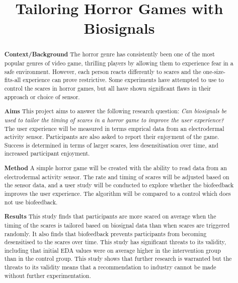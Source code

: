 \documentclass[12pt,a4paper]{article}\usepackage[]{graphicx}\usepackage[]{color}
\title{Tailoring Horror Games with Biosignals}
\author{} %
\date{}
\begin{document}
\maketitle
\begin{abstract}


\textbf{Context/Background}
The horror genre has consistently been one of the most popular genres of video game, thrilling players by allowing them to experience fear in a safe environment.
However, each person reacts differently to scares and the one-size-fits-all experience can prove restrictive.
Some experiments have attempted to use  to control the scares in horror games, but all have shown significant flaws in their approach or choice of sensor.

\textbf{Aims}
This project aims to answer the following research question: \emph{Can biosignals be used to tailor the timing of scares in a horror game to improve the user experience?}
The user experience will be measured in terms emprical data from an electrodermal activity sensor.
Participants are also asked to report their enjoyment of the game.
Success is determined in terms of larger scares, less desensitisation over time, and increased participant enjoyment.

\textbf{Method}
A simple horror game will be created with the ability to read data from an electrodermal activity sensor.
The rate and timing of scares will be adjusted based on the sensor data, and a user study will be conducted to explore whether the biofeedback improves the user experience.
The algorithm will be compared to a control which does not use biofeedback.

\textbf{Results}
This study finds that participants are more scared on average when the timing of the scares is tailored based on biosignal data than when scares are triggered randomly.
It also finds that biofeedback prevents participants from becoming desensitised to the scares over time.
This study has significant threats to its validity, including that initial EDA values were on average higher in the intervention group than in the control group.
This study shows that further research is warranted but the threats to its validity means that a recommendation to industry cannot be made without further experimentation.

\end{abstract}
\end{document}
